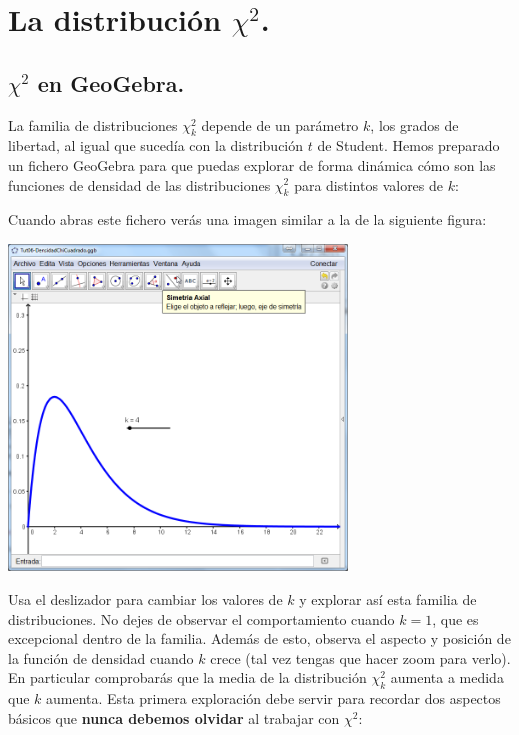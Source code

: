 \documentclass[10pt,a4paper]{article}\usepackage[]{graphicx}\usepackage[]{color}
\begin{document}
\section{La distribución $\chi^2$.}
\label{tut06:sec:DistribucionChiCuadrado}


\subsection{$\chi^2$ en GeoGebra.}
\label{tut06:subsec:Chi2EnGeoGebra}

La familia de distribuciones $\chi^2_k$ depende de un parámetro $k$, los grados de libertad, al igual que sucedía con la distribución $t$ de Student. Hemos preparado un fichero GeoGebra para que puedas explorar de forma dinámica cómo son las funciones de densidad de las distribuciones $\chi^2_k$ para distintos valores de $k$:
\begin{center}
\end{center}
Cuando abras este fichero verás una imagen similar a la de la siguiente figura:
    \begin{center}
    \includegraphics[width=9cm]{../fig/Tut06-36.png}
    \end{center}
Usa el deslizador para cambiar los valores de $k$ y explorar así esta familia de distribuciones. No dejes de observar el comportamiento cuando $k=1$, que es excepcional dentro de la familia. Además de esto, observa el aspecto y posición de la función de densidad cuando $k$ crece (tal vez tengas que hacer zoom para verlo). En particular comprobarás que la media de la distribución $\chi^2_k$ aumenta a medida que $k$ aumenta. Esta primera exploración debe servir para recordar dos aspectos básicos que {\bf nunca debemos olvidar} al trabajar con $\chi^2$:
\end{document}
